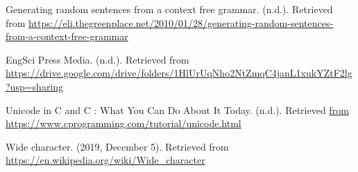 \documentclass[12pt]{article}
\begin{document}
\begin{thebibliography}{20}
	Generating random sentences from a context free grammar. (n.d.). Retrieved from \url{https://eli.thegreenplace.net/2010/01/28/generating-random-sentences-from-a-context-free-grammar}
	
	EngSci Press Media. (n.d.). Retrieved from \url{https://drive.google.com/drive/folders/1HlUrUqNho2NtZmqC4janL1xukYZtF2lg?usp=sharing}
	
	Unicode in C and C : What You Can Do About It Today. (n.d.). Retrieved \url{from https://www.cprogramming.com/tutorial/unicode.html}
	
	Wide character. (2019, December 5). Retrieved from \url{https://en.wikipedia.org/wiki/Wide_character}
\end{thebibliography}

\clearpage

\appendix

\end{document}
